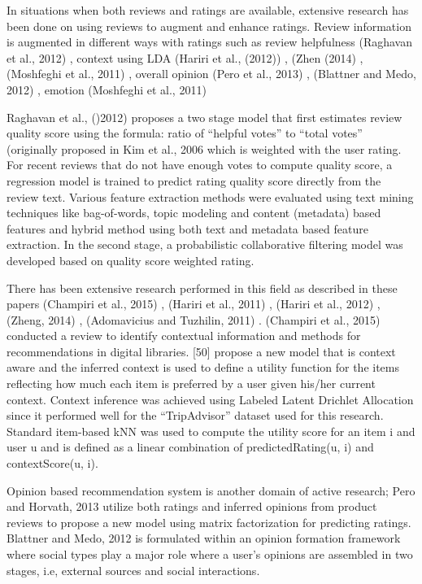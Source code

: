 \documentclass[12pt]{article}
\begin{document}
In situations when both reviews and ratings are available, extensive research has been done on using reviews to augment and enhance ratings. Review information is augmented in different ways \cite{chen} with ratings such as review helpfulness (Raghavan et al., 2012) \cite{raghavan}, context using LDA (Hariri et al., (2012)) \cite{hariri}, (Zhen (2014) \cite{zheng}, (Moshfeghi et al., 2011) \cite{moshfeghi}, overall opinion (Pero et al., 2013) \cite{pero}, (Blattner and Medo, 2012) \cite{blattner}, emotion (Moshfeghi et al., 2011) \cite{moshfeghi}

Raghavan et al., ()2012) \cite{raghavan} proposes a two stage model that first estimates review quality score using the formula: ratio of ``helpful votes'' to ``total votes'' (originally proposed in Kim et al., 2006 \cite{kim} which is weighted with the user rating. For recent reviews that do not have enough votes to compute quality score, a regression model is trained to predict rating quality score directly from the review text. Various feature extraction methods were evaluated using text mining techniques like bag-of-words, topic modeling and content (metadata) based features and hybrid method using both text and metadata based feature extraction. In the second stage, a probabilistic collaborative filtering model was developed based on quality score weighted rating. 

There has been extensive research performed in this field as described in these papers (Champiri et al., 2015) \cite{champiri}, (Hariri et al., 2011) \cite{hariri-2011}, (Hariri et al., 2012) \cite{hariri-2012}, (Zheng, 2014) \cite{zheng}, (Adomavicius and Tuzhilin, 2011) \cite{adomavicius}. (Champiri et al., 2015) \cite{champiri} conducted a review to identify contextual information and methods for recommendations in digital libraries. [50] propose a new model that is context aware and the inferred context is used to define a utility function for the items reflecting how much each item is preferred by a user given his/her current context. Context inference was achieved using Labeled Latent Drichlet Allocation since it performed well for the ``TripAdvisor'' dataset used for this research. Standard item-based kNN was used to compute the utility score for an item i and user u and is defined as a linear combination of predictedRating(u, i) and contextScore(u, i). 

Opinion based recommendation system is another domain of active research; Pero and Horvath, 2013 \cite{pero} utilize both ratings and inferred opinions from product reviews to propose a new model using matrix factorization for predicting ratings. Blattner and Medo, 2012 \cite{blattner} is formulated within an opinion formation framework where social types play a major role where a user's opinions are assembled in two stages, i.e, external sources and social interactions. 
\end{document}

